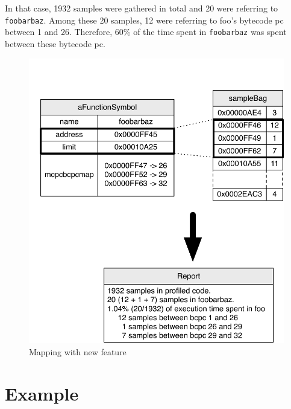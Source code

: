 \documentclass[10pt,preprint,nonatbib]{sigplanconf}
\newcommand{\ct}{\lstinline[backgroundcolor=\color{white},basicstyle=\small\ttfamily]}
\begin{document}
In that case, 1932 samples were gathered in total and 20 were referring to \ct{foobarbaz}. Among these 20 samples, 12 were referring to foo's bytecode pc between 1 and 26. Therefore, 60\% of the time spent in \ct{foobarbaz} was spent between these bytecode pc.


 \begin{figure}[!htp]
     \begin{center}
         \includegraphics[width=1.0\linewidth]{NewMapping}
         \caption{Mapping with new feature}
         \label{fig:NewMapping}
     \end{center}
 \end{figure}
 

\section{Example}
\end{document}
